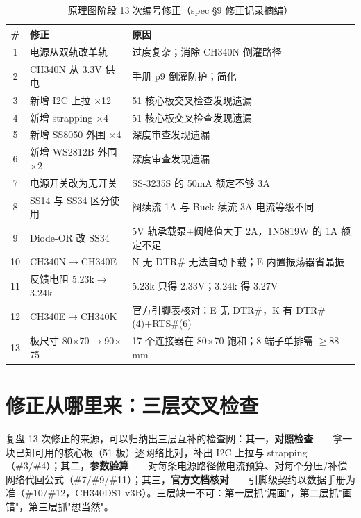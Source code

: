 \begin{table}[htbp]
  \centering
  \caption{原理图阶段 13 次编号修正（spec \S 9 修正记录摘编）}
  \label{tab:sch-fixes}
  \begin{tabular}{clp{8.2cm}}
    \toprule
    \# & 修正 & 原因 \\
    \midrule
    1 & 电源从双轨改单轨 & 过度复杂；消除 CH340N 倒灌路径 \\
    2 & CH340N 从 3.3V 供电 & 手册 p9 倒灌防护；简化 \\
    3 & 新增 I2C 上拉 $\times$12 & 51 核心板交叉检查发现遗漏 \\
    4 & 新增 strapping $\times$4 & 51 核心板交叉检查发现遗漏 \\
    5 & 新增 SS8050 外围 $\times$4 & 深度审查发现遗漏 \\
    6 & 新增 WS2812B 外围 $\times$2 & 深度审查发现遗漏 \\
    7 & 电源开关改为无开关 & SS-3235S 的 50mA 额定不够 3A \\
    8 & SS14 与 SS34 区分使用 & 阀续流 1A 与 Buck 续流 3A 电流等级不同 \\
    9 & Diode-OR 改 SS34 & 5V 轨承载泵+阀峰值大于 2A，1N5819W 的 1A 额定不足 \\
    10 & CH340N$\to$CH340E & N 无 DTR\# 无法自动下载；E 内置振荡器省晶振 \\
    11 & 反馈电阻 5.23k$\to$3.24k & 5.23k 只得 2.33V；3.24k 得 3.27V \\
    12 & CH340E$\to$CH340K & 官方引脚表核对：E 无 DTR\#，K 有 DTR\#(4)+RTS\#(6) \\
    13 & 板尺寸 80$\times$70$\to$90$\times$75 & 17 个连接器在 80$\times$70 饱和；8 端子单排需 $\ge$88\,mm \\
    \bottomrule
  \end{tabular}
\end{table}

\section{修正从哪里来：三层交叉检查}
\label{sec:sch-method}

复盘 13 次修正的来源，可以归纳出三层互补的检查网：其一，\textbf{对照检查}——拿一块已知可用的核心板（51 板）逐网络比对，补出 I2C 上拉与 strapping（\#3/\#4）；其二，\textbf{参数验算}——对每条电源路径做电流预算、对每个分压/补偿网络代回公式（\#7/\#9/\#11）；其三，\textbf{官方文档核对}——引脚级契约以数据手册为准（\#10/\#12，CH340DS1 v3B）。三层缺一不可：第一层抓"漏画"，第二层抓"画错"，第三层抓"想当然"。

